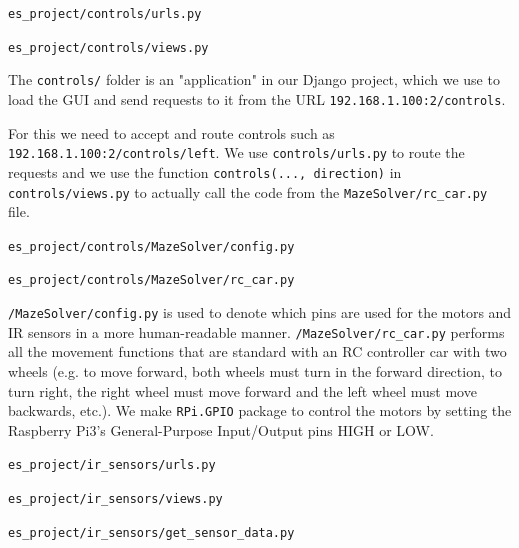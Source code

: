 \begin{description}[font=\quad $\circ$, topsep=6pt, itemsep=3em]
			
			
		\item \texttt{es\_project/controls/urls.py}
			
			
		\item \texttt{es\_project/controls/views.py}
			
			
			The \texttt{controls/} folder is an "application" in our Django project, which we use to load the GUI and send requests to it from the URL \texttt{192.168.1.100:2/controls}. 
			
			For this we need to accept and route controls such as \texttt{192.168.1.100:2/controls/left}. We use \texttt{controls/urls.py} to route the requests and we use the function \texttt{controls(..., direction)} in \texttt{controls/views.py} to actually call the code from the \texttt{MazeSolver/rc\_car.py} file.
			
		
		\item \texttt{es\_project/controls/MazeSolver/config.py}
			

		\clearpage			
		\item \texttt{es\_project/controls/MazeSolver/rc\_car.py}
			
			
			\texttt{/MazeSolver/config.py} is used to denote which pins are used for the motors and IR sensors in a more human-readable manner. \texttt{/MazeSolver/rc\_car.py} performs all the movement functions that are standard with an RC controller car with two wheels (e.g. to move forward, both wheels must turn in the forward direction, to turn right, the right wheel must move forward and the left wheel must move backwards, etc.). We make \texttt{RPi.GPIO} package to control the motors by setting the Raspberry Pi3's General-Purpose Input/Output pins HIGH or LOW.
		
		
		
		
		\item \texttt{es\_project/ir\_sensors/urls.py}
			
		
		\item \texttt{es\_project/ir\_sensors/views.py}
			
		
		\item \texttt{es\_project/ir\_sensors/get\_sensor\_data.py}
			
		

\end{description}
